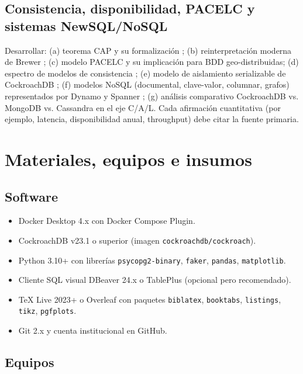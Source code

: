 \documentclass[11pt,a4paper]{article}
\begin{document}
\subsection{Consistencia, disponibilidad, PACELC y sistemas NewSQL/NoSQL}

Desarrollar: (a) teorema CAP y su formalizaci\'on \parencite{GilbertLynch2002CAP}; (b) reinterpretaci\'on moderna de Brewer \parencite{Brewer2012CAP12}; (c) modelo PACELC \parencite{Abadi2012PACELC} y su implicaci\'on para BDD geo-distribuidas; (d) espectro de modelos de consistencia \parencite{ViottiVukolic2016Consistency}; (e) modelo de aislamiento serializable de CockroachDB \parencite{Taft2020CockroachDB}; (f) modelos NoSQL (documental, clave-valor, columnar, grafos) representados por Dynamo \parencite{DeCandia2007Dynamo} y Spanner \parencite{Corbett2013Spanner}; (g) an\'alisis comparativo CockroachDB vs. MongoDB vs. Cassandra en el eje C/A/L. Cada afirmaci\'on cuantitativa (por ejemplo, latencia, disponibilidad anual, throughput) debe citar la fuente primaria.

\section{Materiales, equipos e insumos}

\subsection{Software}

\begin{itemize}[nosep,leftmargin=1.6em]
    \item Docker Desktop 4.x con Docker Compose Plugin.
    \item CockroachDB v23.1 o superior (imagen \texttt{cockroachdb/cockroach}).
    \item Python 3.10+ con librer\'ias \texttt{psycopg2-binary}, \texttt{faker}, \texttt{pandas}, \texttt{matplotlib}.
    \item Cliente SQL visual DBeaver 24.x o TablePlus (opcional pero recomendado).
    \item TeX Live 2023+ o Overleaf con paquetes \texttt{biblatex}, \texttt{booktabs}, \texttt{listings}, \texttt{tikz}, \texttt{pgfplots}.
    \item Git 2.x y cuenta institucional en GitHub.
\end{itemize}

\subsection{Equipos}
\end{document}
